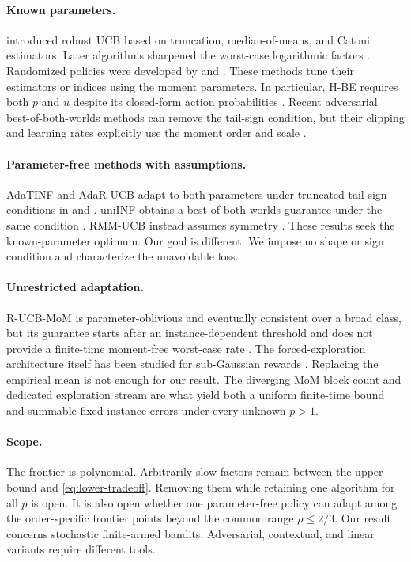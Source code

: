 \documentclass[twoside]{article}
\begin{document}
\paragraph{Known parameters.}
\citet{bubeck2013bandits} introduced robust UCB based on truncation,
median-of-means, and Catoni estimators. Later algorithms sharpened the
worst-case logarithmic factors \citep{wei2020minimax}. Randomized policies
were developed by \citet{agrawal2021regret} and \citet{park2026boltzmann}.
These methods tune their estimators or indices using the moment parameters.
In particular, H-BE requires both $p$ and $u$ despite its closed-form action
probabilities \citep{park2026boltzmann}.
Recent adversarial best-of-both-worlds methods can remove the tail-sign
condition, but their clipping and learning rates explicitly use the moment
order and scale \citep{zhao2025linear}.

\paragraph{Parameter-free methods with assumptions.}
AdaTINF and AdaR-UCB adapt to both parameters under truncated tail-sign
conditions in \citet{huang2022adaptive} and \citet{genalti2024adaptive}.
uniINF obtains a best-of-both-worlds guarantee under the same condition
\citep{chen2025uniinf}. RMM-UCB instead assumes symmetry
\citep{tamas2024data}. These results seek the known-parameter optimum. Our
goal is different. We impose no shape or sign condition and characterize
the unavoidable loss.

\paragraph{Unrestricted adaptation.}
R-UCB-MoM is parameter-oblivious and eventually consistent over a broad
class, but its guarantee starts after an instance-dependent threshold and
does not provide a finite-time moment-free worst-case rate
\citep{ashutosh2021letting}. The forced-exploration architecture itself has
been studied for sub-Gaussian rewards \citep{han2024forced}. Replacing the
empirical mean is not enough for our result. The diverging MoM block count
and dedicated exploration stream are what yield both a uniform finite-time
bound and summable fixed-instance errors under every unknown $p>1$.

\paragraph{Scope.}
The frontier is polynomial. Arbitrarily slow factors remain between the
upper bound and \eqref{eq:lower-tradeoff}. Removing them while retaining one
algorithm for all $p$ is open. It is also open whether one parameter-free
policy can adapt among the order-specific frontier points beyond the common
range $\rho\leq2/3$. Our result concerns stochastic finite-armed bandits.
Adversarial, contextual, and linear variants require different tools.
\end{document}
